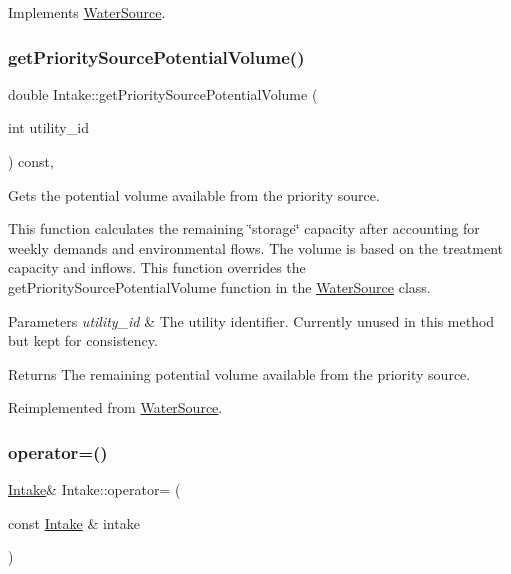 Implements \mbox{\hyperlink{classWaterSource_ac070445379fe706f65b977dade4f3fbc}{Water\+Source}}.

\mbox{\label{classIntake_a8d1fc6855451f3dff1a2f0efcd5da8ee}} 
\subsubsection{\texorpdfstring{get\+Priority\+Source\+Potential\+Volume()}{getPrioritySourcePotentialVolume()}}
{\footnotesize\ttfamily double Intake\+::get\+Priority\+Source\+Potential\+Volume (\begin{DoxyParamCaption}\item[{int}]{utility\+\_\+id }\end{DoxyParamCaption}) const\hspace{0.3cm}{\ttfamily [override]}, {\ttfamily [virtual]}}



Gets the potential volume available from the priority source. 

This function calculates the remaining \char`\"{}storage\char`\"{} capacity after accounting for weekly demands and environmental flows. The volume is based on the treatment capacity and inflows. This function overrides the get\+Priority\+Source\+Potential\+Volume function in the \mbox{\hyperlink{classWaterSource}{Water\+Source}} class.


\begin{DoxyParams}{Parameters}
{\em utility\+\_\+id} & The utility identifier. Currently unused in this method but kept for consistency.\\
\hline
\end{DoxyParams}
\begin{DoxyReturn}{Returns}
The remaining potential volume available from the priority source. 
\end{DoxyReturn}


Reimplemented from \mbox{\hyperlink{classWaterSource_a00a432eba75eaae7195338a8514ac853}{Water\+Source}}.

\mbox{\label{classIntake_aa4a7adbb8380d091197011d9f1877005}} 
\subsubsection{\texorpdfstring{operator=()}{operator=()}}
{\footnotesize\ttfamily \mbox{\hyperlink{classIntake}{Intake}}\& Intake\+::operator= (\begin{DoxyParamCaption}\item[{const \mbox{\hyperlink{classIntake}{Intake}} \&}]{intake }\end{DoxyParamCaption})}



